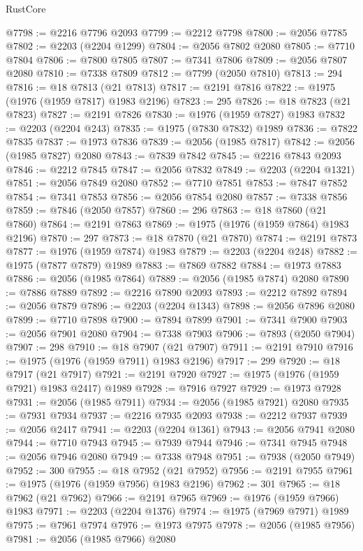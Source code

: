 \begin{lexlean}{RustCore}
\begin{coremodule}
@7798 := @2216 @7796 @2093
@7799 := @2212 @7798
@7800 := @2056 @7785
@7802 := @2203 (@2204 @1299)
@7804 := @2056 @7802 @2080
@7805 := @7710 @7804
@7806 := @7800 @7805
@7807 := @7341 @7806
@7809 := @2056 @7807 @2080
@7810 := @7338 @7809
@7812 := @7799 (@2050 @7810)
@7813 := 294
@7816 := @18 @7813 (@21 @7813)
@7817 := @2191 @7816
@7822 := @1975 (@1976 (@1959 @7817) @1983 @2196)
@7823 := 295
@7826 := @18 @7823 (@21 @7823)
@7827 := @2191 @7826
@7830 := @1976 (@1959 @7827) @1983
@7832 := @2203 (@2204 @243)
@7835 := @1975 (@7830 @7832) @1989
@7836 := @7822 @7835
@7837 := @1973 @7836
@7839 := @2056 (@1985 @7817)
@7842 := @2056 (@1985 @7827) @2080
@7843 := @7839 @7842
@7845 := @2216 @7843 @2093
@7846 := @2212 @7845
@7847 := @2056 @7832
@7849 := @2203 (@2204 @1321)
@7851 := @2056 @7849 @2080
@7852 := @7710 @7851
@7853 := @7847 @7852
@7854 := @7341 @7853
@7856 := @2056 @7854 @2080
@7857 := @7338 @7856
@7859 := @7846 (@2050 @7857)
@7860 := 296
@7863 := @18 @7860 (@21 @7860)
@7864 := @2191 @7863
@7869 := @1975 (@1976 (@1959 @7864) @1983 @2196)
@7870 := 297
@7873 := @18 @7870 (@21 @7870)
@7874 := @2191 @7873
@7877 := @1976 (@1959 @7874) @1983
@7879 := @2203 (@2204 @248)
@7882 := @1975 (@7877 @7879) @1989
@7883 := @7869 @7882
@7884 := @1973 @7883
@7886 := @2056 (@1985 @7864)
@7889 := @2056 (@1985 @7874) @2080
@7890 := @7886 @7889
@7892 := @2216 @7890 @2093
@7893 := @2212 @7892
@7894 := @2056 @7879
@7896 := @2203 (@2204 @1343)
@7898 := @2056 @7896 @2080
@7899 := @7710 @7898
@7900 := @7894 @7899
@7901 := @7341 @7900
@7903 := @2056 @7901 @2080
@7904 := @7338 @7903
@7906 := @7893 (@2050 @7904)
@7907 := 298
@7910 := @18 @7907 (@21 @7907)
@7911 := @2191 @7910
@7916 := @1975 (@1976 (@1959 @7911) @1983 @2196)
@7917 := 299
@7920 := @18 @7917 (@21 @7917)
@7921 := @2191 @7920
@7927 := @1975 (@1976 (@1959 @7921) @1983 @2417) @1989
@7928 := @7916 @7927
@7929 := @1973 @7928
@7931 := @2056 (@1985 @7911)
@7934 := @2056 (@1985 @7921) @2080
@7935 := @7931 @7934
@7937 := @2216 @7935 @2093
@7938 := @2212 @7937
@7939 := @2056 @2417
@7941 := @2203 (@2204 @1361)
@7943 := @2056 @7941 @2080
@7944 := @7710 @7943
@7945 := @7939 @7944
@7946 := @7341 @7945
@7948 := @2056 @7946 @2080
@7949 := @7338 @7948
@7951 := @7938 (@2050 @7949)
@7952 := 300
@7955 := @18 @7952 (@21 @7952)
@7956 := @2191 @7955
@7961 := @1975 (@1976 (@1959 @7956) @1983 @2196)
@7962 := 301
@7965 := @18 @7962 (@21 @7962)
@7966 := @2191 @7965
@7969 := @1976 (@1959 @7966) @1983
@7971 := @2203 (@2204 @1376)
@7974 := @1975 (@7969 @7971) @1989
@7975 := @7961 @7974
@7976 := @1973 @7975
@7978 := @2056 (@1985 @7956)
@7981 := @2056 (@1985 @7966) @2080

\end{coremodule}
\end{lexlean}
